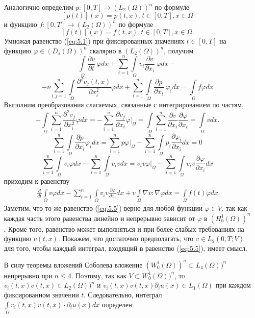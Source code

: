 Аналогично определим $p:[0,T]\rightarrow (L_2(\Omega))^n$ по формуле $$[p(t)](x)=p(t,x), t\in[0,T],
x\in\Omega$$ и функцию $f:[0,T]\rightarrow (L_2(\Omega))^n$ по формуле $$[f(t)](x)=f(t,x), t\in[0,T], x\in\Omega.$$
Умножая равенство (\ref{eq:5.1}) при фиксированных значениях $t\in [0,T]$ на функцию $\varphi\in (D_s(\Omega))^n$ скалярно в $(L_2(\Omega))^n$, получим
$$\int\limits_\Omega \frac{\partial v}{\partial t}\ \varphi dx+\sum_{i=1}^n\int\limits_\Omega v_i\frac{\partial v}{\partial x_i}\ \varphi dx-$$
$$-\nu \sum_{i,j=1}^n\int\limits_\Omega\frac{\partial^2 v_j(t,x)}{\partial x^{2}_i} \varphi dx+\sum_{i=1}^n\int\limits_\Omega \frac{\partial p}{\partial x_i}\ \varphi_idx=\int\limits_\Omega f\varphi dx$$
Выполним преобразования слагаемых, связанные с интегрированием по частям,
$$-\int\limits_\Omega \sum_{i=1}^{n}\frac{\partial^2 v_j}{\partial x^{2}_i}\varphi dx=-\sum_{i=1}^{n}\frac{\partial v_j}{\partial x_i}\varphi \bigg|_\Omega
=\int\limits_\Omega\sum_{i=1}^{n}\frac{\partial v}{\partial x_i}\frac{\partial \varphi}{\partial x_i}=\int\limits_\Omega v dx .$$
$$\sum_{i=1}^{n}\int\limits_\Omega \frac{\partial p}{\partial x_i}\varphi_i dx
=\sum_{i=1}^{n}p\varphi \bigg|_{\Omega}-\sum_{i=1}^{n}\int\limits_\Omega p_i\frac{\partial \varphi_i}{\partial x_i}dx=0$$
$$\sum_{i=1}^{n}\int\limits_\Omega v_i\varphi dx-\sum_{i=1}^{n}\int\limits_\Omega v_i v dx
=v_i v \varphi \bigg|_{\Omega}-\sum_{i=1}^{n}\int\limits_\Omega v_i v \frac{\partial \varphi}{\partial x_i}dx$$
приходим к равенству
\begin{equation}\label{eq:5.5}
    \begin{gathered}
        \frac{d}{dt}\int\limits_\Omega v \varphi dx-\sum_{i=1}^{n}\int\limits_\Omega v_i v
        \frac{\partial \varphi }{\partial x_i}dx + v\int\limits_\Omega \nabla v :\nabla\varphi dx
        =\int\limits_\Omega f(t)\varphi dx
    \end{gathered}
\end{equation}
Заметим, что то же равенство (\ref{eq:5.5}) верно для любой функции $\varphi\in V$, так как каждая часть этого равенства линейно и непрерывно зависит от
$\varphi$ в $(H^{1}_{0}(\Omega))^n$. Кроме того, равенство может выполняться и при более слабых требованиях на функцию $v(t,x)$.
Покажем, что достаточно предполагать, что $v\in L_2(0,T;V)$ для того, чтобы каждый интеграл, входящий в равенство (\ref{eq:5.5}), имеет смысл.

В силу теоремы вложений Соболева вложение $(W^{1}_{0}(\Omega))^n\subset L_4(\Omega))^n$ непрерывно при $n\leqslant4$.
Поэтому, так как $V\subset W^{1}_{0}(\Omega))^n$, то $v_i(t,x)v(t,x)\in L_2(\Omega))^n$ и $v_i(t,x)v(t,x)\partial_iu(x)\in L_1(\Omega)$
при каждом фиксированном значении $t$. Следовательно, интеграл $\int\limits_\Omega v_i(t,x)v(t,x)\cdot\partial_iu(x)dx$ определен.

